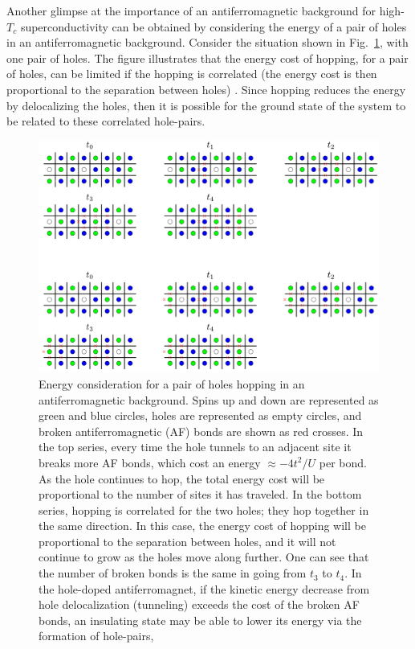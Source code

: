 Another glimpse at the importance of an antiferromagnetic background for
high-$T_{c}$ superconductivity can be obtained by considering the energy of a
pair of holes in an antiferromagnetic background.   Consider the situation
shown in Fig.~\ref{fig:holepairing}, with one pair of holes.  The figure
illustrates that the energy cost of hopping, for a pair of holes, can be
limited if the hopping is correlated (the energy cost is then proportional to
the separation between holes) .  Since hopping reduces the energy by
delocalizing the holes, then it is possible for the ground state of the system
to be related to these correlated hole-pairs. 
\begin{figure} 
\centering
\includegraphics[width=\textwidth]{../illustrations/hole-pairing/pair_hopping.png}
\caption[Holes hopping in antiferromagnetic background.]{\small Energy
consideration for a pair of holes hopping in an antiferromagnetic background.
Spins up and down are represented as green and blue circles, holes are
represented as empty circles, and broken antiferromagnetic (AF) bonds are shown
as red crosses.  In the top series, every time the hole tunnels to an adjacent
site it breaks more AF bonds, which cost an energy $\approx -4t^{2}/{U}$ per
bond.  As the hole continues to hop, the total energy cost will be proportional
to the number of sites it has traveled.  In the bottom series, hopping is
correlated for the two holes; they hop together in the same direction.  In this
case, the energy cost of hopping will be proportional to the separation between
holes,  and it will not continue to grow as the holes move along further.   One
can see that the number of broken bonds is the same in going from $t_{3}$ to
$t_{4}$.  In the hole-doped antiferromagnet, if the kinetic energy decrease
from hole delocalization (tunneling) exceeds the cost of the broken AF bonds,
an insulating state may be able to lower its energy via the formation of
hole-pairs, } 
\label{fig:holepairing} 
\end{figure}


